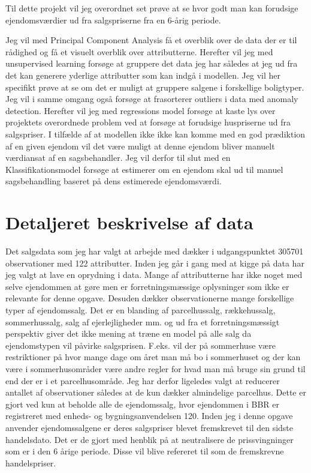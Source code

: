 \documentclass{report}
\begin{document}
Til dette projekt vil jeg overordnet set prøve at se hvor godt man kan forudsige ejendomsværdier ud fra salgspriserne fra en 6-årig periode. 

Jeg vil med Principal Component Analysis få et overblik over de data der er til rådighed og få et visuelt overblik over attributterne. 
Herefter vil jeg med unsupervised learning forsøge at gruppere det data jeg har således at jeg ud fra det kan generere yderlige attributter som kan indgå i modellen. Jeg vil her specifikt prøve at se om det er muligt at gruppere salgene i forskellige boligtyper. Jeg vil i samme omgang også forsøge at frasorterer outliers i data med anomaly detection. 
Herefter vil jeg med regressions model forsøge at kaste lys over projektets overordnede problem ved at forsøge at forudsige huspriserne ud fra salgspriser. I tilfælde af at modellen ikke ikke kan komme med en god prædiktion af en given ejendom vil det være muligt at denne ejendom bliver manuelt værdiansat af en sagsbehandler. Jeg vil derfor til slut med en Klassifikationsmodel forsøge at estimerer om en ejendom skal ud til manuel sagsbehandling baseret på dens estimerede ejendomsværdi.

\section{Detaljeret beskrivelse af data}

Det salgsdata som jeg har valgt at arbejde med dækker i udgangspunktet 305701 observationer med 122 attributter. Inden jeg går i gang med at kigge på data har jeg valgt at lave en oprydning i data.
Mange af attributterne har ikke noget med selve ejendommen at gøre men er forretningsmæssige oplysninger som ikke er relevante for denne opgave. Desuden dækker observationerne mange forskellige typer af ejendomssalg. Det er en blanding af parcelhussalg, rækkehussalg, sommerhussalg, salg af ejerlejligheder mm. og ud fra et forretningsmæssigt perspektiv giver det ikke mening at træne en model på alle salg da ejendomstypen vil påvirke salgsprisen. F.eks. vil der på sommerhuse være restriktioner på hvor mange dage om året man må bo i sommerhuset og der kan være i sommerhusområder være andre regler for hvad man må bruge sin grund til end der er i et parcelhusområde. Jeg har derfor ligeledes valgt at reducerer antallet af observationer således at de kun dækker almindelige parcelhus. Dette er gjort ved kun at beholde alle de ejendomssalg, hvor ejendommen i BBR er registreret med enheds- og bygningsanvendelsen 120. 
Inden jeg i denne opgave anvender ejendomssalgene er deres salgspriser blevet fremskrevet til den sidste handelsdato. Det er de gjort med henblik på at neutralisere de prissvingninger som er i den 6 årige periode. Disse vil blive refereret til som de fremskrevne handelspriser. 
\end{document}
